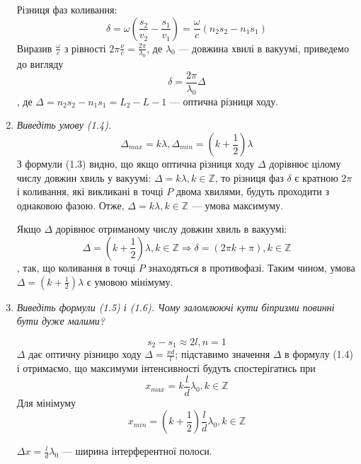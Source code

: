 \documentclass[a4paper,10pt,notitlepage,pdftex,headsepline]{scrartcl}
\begin{document}
\begin{enumerate}
Різниця фаз коливання:
$$\delta = \omega\left(\frac{s_2}{v_2} - \frac{s_1}{v_1}\right) = \frac{\omega}{c}\left(n_2 s_2 - n_1 s_1\right)$$
Виразив $\frac{\omega}{c}$ з рівності $2\pi\frac{\nu}{c}=\frac{2\pi}{\lambda_0}$, де $\lambda_0$ --- довжина хвилі в вакуумі, приведемо до вигляду
$$\delta = \frac{2\pi}{\lambda_0}\Delta$$, де $\Delta = n_2 s_2 - n_1 s_1 = L_2 - L-1$ --- оптична різниця ходу.
\item \textit{Виведіть умову (1.4).}
$$\Delta_{max} = k\lambda, \Delta_{min} = \left(k + \frac12\right)\lambda$$
З формули (1.3) видно, що якщо оптична різниця ходу $\Delta$ дорівнює цілому числу довжин хвиль у вакуумі: $\Delta = k\lambda, k\in\mathbb{Z}$, то різниця фаз $\delta$ є кратною $2 \pi$ і коливання, які викликані в точці $P$ двома хвилями, будуть проходити з однаковою фазою.
Отже, $\Delta = k\lambda, k\in\mathbb{Z}$ --- умова максимуму.

Якщо $\Delta$ дорівнює отриманому числу довжин хвиль в вакуумі:
$$\Delta = \left(k + \frac12\right)\lambda, k\in\mathbb{Z} \Rightarrow \delta = \left(2\pi k + \pi\right), k\in\mathbb{Z}$$,
так, що коливання в точці $P$ знаходяться в противофазі.
Таким чином, умова $\Delta = \left(k +\frac12\right)\lambda$ є умовою мінімуму.
\item \textit{Виведіть формули (1.5) і (1.6). Чому заломлюючі кути біпризми повинні бути дуже малими?}

$$s_2 - s_1 \approx 2l, n = 1$$
$\Delta$ дає оптичну різницю ходу $\Delta = \frac{x d}{l}$;
підставимо значення $\Delta$ в формулу (1.4) і отримаємо, що максимуми інтенсивності будуть спостерігатись при $$x_{max} = k\frac{l}{d}\lambda_0, k\in\mathbb{Z}$$
Для мінімуму $$x_{min} = \left(k+\frac12\right)\frac{l}{d}\lambda_0, k\in\mathbb{Z}$$

$\Delta x = \frac{l}{d}\lambda_0$ --- ширина інтерферентної полоси.
\end{enumerate}
\end{document}
